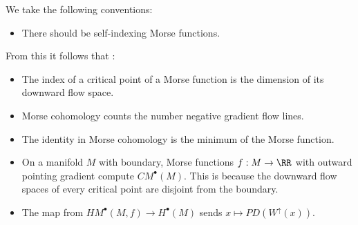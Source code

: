 
 \begin{convention}
We take the following conventions:
\begin{itemize}
    \item There should be self-indexing Morse functions.
\end{itemize}
From this it follows that :
\begin{itemize}
    \item The index of a critical point of a Morse function is the dimension of its downward flow space.
    \item Morse cohomology counts the number negative gradient flow lines.
    \item The identity in Morse cohomology is the minimum of the Morse function.
    \item On a manifold $M$ with boundary, Morse functions $f: M\to \RR$ with outward pointing gradient compute $CM^\bullet(M)$. This is because the downward flow spaces of every critical point are disjoint from the boundary.
    \item The map from $HM^\bullet(M, f)\to H^\bullet(M)$ sends $x\mapsto PD(W^\uparrow(x))$.
\end{itemize}

\end{convention}